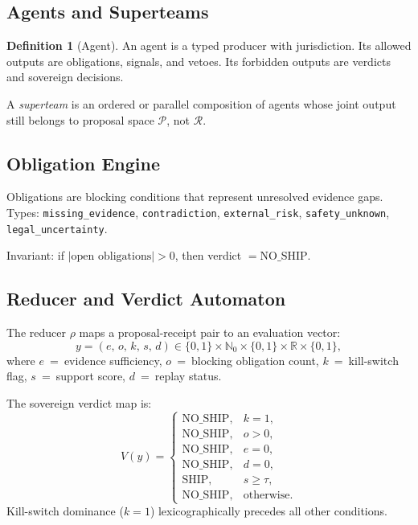 \documentclass[11pt,a4paper]{article}
\theoremstyle{plain}
\theoremstyle{definition}
\newtheorem{definition}[theorem]{Definition}
\theoremstyle{remark}
\newcommand{\Prop}{\mathcal{P}}
\newcommand{\Rec}{\mathcal{R}}
\begin{document}
\subsection{Agents and Superteams}

\begin{definition}[Agent]
An agent is a typed producer with jurisdiction.
Its allowed outputs are obligations, signals, and vetoes.
Its forbidden outputs are verdicts and sovereign decisions.
\end{definition}

A \emph{superteam} is an ordered or parallel composition of agents
whose joint output still belongs to proposal space $\Prop$, not $\Rec$.

\subsection{Obligation Engine}

Obligations are blocking conditions that represent unresolved evidence gaps.
Types: \texttt{missing\_evidence}, \texttt{contradiction},
\texttt{external\_risk}, \texttt{safety\_unknown}, \texttt{legal\_uncertainty}.

Invariant: if $|\text{open obligations}| > 0$, then verdict $= \mathrm{NO\_SHIP}$.

\subsection{Reducer and Verdict Automaton}

The reducer $\rho$ maps a proposal-receipt pair to an evaluation vector:
\[
  y = (e,\, o,\, k,\, s,\, d) \in \{0,1\} \times \mathbb{N}_0
       \times \{0,1\} \times \mathbb{R} \times \{0,1\},
\]
where $e$~=~evidence sufficiency, $o$~=~blocking obligation count,
$k$~=~kill-switch flag, $s$~=~support score, $d$~=~replay status.

The sovereign verdict map is:
\[
  V(y) =
  \begin{cases}
    \mathrm{NO\_SHIP}, & k = 1, \\
    \mathrm{NO\_SHIP}, & o > 0, \\
    \mathrm{NO\_SHIP}, & e = 0, \\
    \mathrm{NO\_SHIP}, & d = 0, \\
    \mathrm{SHIP},     & s \ge \tau, \\
    \mathrm{NO\_SHIP}, & \text{otherwise.}
  \end{cases}
\]
Kill-switch dominance ($k = 1$) lexicographically precedes all other conditions.
\end{document}
